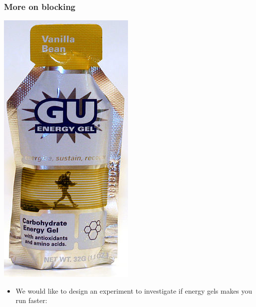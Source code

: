 \begin{frame}
\frametitle{More on blocking}


{
\begin{center}
\includegraphics[width=\textwidth]{1-3_data_collection_principles/figures/gu}
\end{center}
}
{
\begin{itemize}
\item We would like to design an experiment to investigate if energy gels makes you run faster:


\end{itemize}}
\end{frame}
